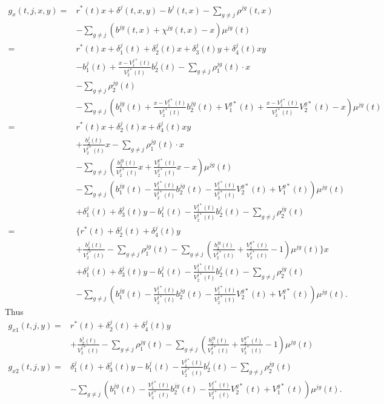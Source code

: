 \documentclass[12pt]{article}
\begin{document}
\begin{align*}
g_x(t,j,x,y)=&r^*(t) x + \delta^j(t,x,y)-b^j(t,x)-\sum_{g \neq j} \rho^{jg}(t,x)
\\
&-\sum_{g \neq j} \left( b^{jg}(t,x)+\chi^{jg}(t,x)-x \right) \mu^{jg}(t)
\\
=&
r^*(t) x + \delta_1^j(t)+\delta_2^j(t)x+\delta_3^j(t)y+\delta_4^j(t)xy\\
&-b_1^j(t)+\frac{x-V_1^{j*}(t)}{V_2^{j*}(t)}b^j_2(t)
-\sum_{g \neq j} \rho_1^{jg}(t)\cdot x
\\
&-\sum_{g \neq j} \rho_2^{jg}(t)
\\
&-\sum_{g \neq j} \left( b_1^{jg}(t)+\frac{x-V_1^{j*}(t)}{V_2^{j*}(t)}b^{jg}_2(t)+ V^{g*}_1(t) + \frac{x-V^{j*}_1(t)}{V^{j*}_2(t)}V^{g*}_2(t)-x \right) \mu^{jg}(t)
\\
=&
r^*(t) x +\delta_2^j(t)x+\delta_4^j(t)xy\\
&+\frac{b^j_2(t)}{V_2^{j*}(t)}x
-\sum_{g \neq j} \rho_1^{jg}(t)\cdot x
\\
&-\sum_{g \neq j} \left(\frac{b^{jg}_2(t)}{V_2^{j*}(t)}x + \frac{V^{g*}_2(t)}{V^{j*}_2(t)}x-x \right) \mu^{jg}(t)
\\
&-\sum_{g \neq j} \left( b_1^{jg}(t)-\frac{V_1^{j*}(t)}{V_2^{j*}(t)}b^{jg}_2(t) -\frac{V^{j*}_1(t)}{V^{j*}_2(t)}V^{g*}_2(t)+V^{g*}_1(t) \right) \mu^{jg}(t)
\\
&+ \delta_1^j(t)
+\delta_3^j(t)y
-b_1^j(t)
-\frac{V_1^{j*}(t)}{V_2^{j*}(t)}b^j_2(t)
-\sum_{g \neq j} \rho_2^{jg}(t)
\\
=&
\bigg\lbrace 
r^*(t)  +\delta_2^j(t)+\delta_4^j(t)y\\
&+\frac{b^j_2(t)}{V_2^{j*}(t)}
-\sum_{g \neq j} \rho_1^{jg}(t)
-\sum_{g \neq j} \left(\frac{b^{jg}_2(t)}{V_2^{j*}(t)} + \frac{V^{g*}_2(t)}{V^{j*}_2(t)}-1 \right) \mu^{jg}(t)
\bigg\rbrace x
\\
&+ \delta_1^j(t)
+\delta_3^j(t)y
-b_1^j(t)
-\frac{V_1^{j*}(t)}{V_2^{j*}(t)}b^j_2(t)
-\sum_{g \neq j} \rho_2^{jg}(t)
\\
&-\sum_{g \neq j} \left( b_1^{jg}(t)-\frac{V_1^{j*}(t)}{V_2^{j*}(t)}b^{jg}_2(t) -\frac{V^{j*}_1(t)}{V^{j*}_2(t)}V^{g*}_2(t)+V^{g*}_1(t) \right) \mu^{jg}(t).
\end{align*}
Thus
\begin{align*}
g_{x1}(t,j,y)=&r^*(t)  +\delta_2^j(t)+\delta_4^j(t)y\\
&+\frac{b^j_2(t)}{V_2^{j*}(t)}
-\sum_{g \neq j} \rho_1^{jg}(t)
-\sum_{g \neq j} \left(\frac{b^{jg}_2(t)}{V_2^{j*}(t)} + \frac{V^{g*}_2(t)}{V^{j*}_2(t)}-1 \right) \mu^{jg}(t)
\\
g_{x2}(t,j,y)=& \delta_1^j(t)
+\delta_3^j(t)y
-b_1^j(t)
-\frac{V_1^{j*}(t)}{V_2^{j*}(t)}b^j_2(t)
-\sum_{g \neq j} \rho_2^{jg}(t)
\\
&-\sum_{g \neq j} \left( b_1^{jg}(t)-\frac{V_1^{j*}(t)}{V_2^{j*}(t)}b^{jg}_2(t) -\frac{V^{j*}_1(t)}{V^{j*}_2(t)}V^{g*}_2(t)+V^{g*}_1(t) \right) \mu^{jg}(t).
\end{align*}
\end{document}
